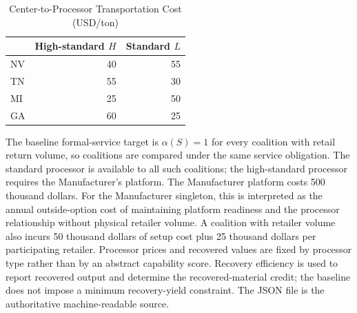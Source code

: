 \begin{table}[htbp]
\centering
\caption{Center-to-Processor Transportation Cost (USD/ton)}
\label{tab:app_ch4_processor_transport}
\begin{tabular}{lrr}
\toprule
 & High-standard $H$ & Standard $L$ \\
\midrule
NV & 40 & 55 \\
TN & 55 & 30 \\
MI & 25 & 50 \\
GA & 60 & 25 \\
\bottomrule
\end{tabular}
\end{table}

The baseline formal-service target is $\alpha(S)=1$ for every coalition with
retail return volume, so coalitions are compared under the same service
obligation. The standard processor is available to all such coalitions; the
high-standard processor requires the Manufacturer's platform. The Manufacturer
platform costs 500 thousand dollars. For the Manufacturer singleton, this is
interpreted as the annual outside-option cost of maintaining platform readiness
and the processor relationship without physical retailer volume. A coalition
with retailer volume also incurs 50 thousand dollars of setup cost plus 25
thousand dollars per participating retailer. Processor prices and recovered
values are fixed by processor type rather than by an abstract capability score.
Recovery efficiency is used to report recovered output and determine the
recovered-material credit; the baseline does not impose a minimum recovery-yield
constraint. The JSON file is the authoritative machine-readable source.
